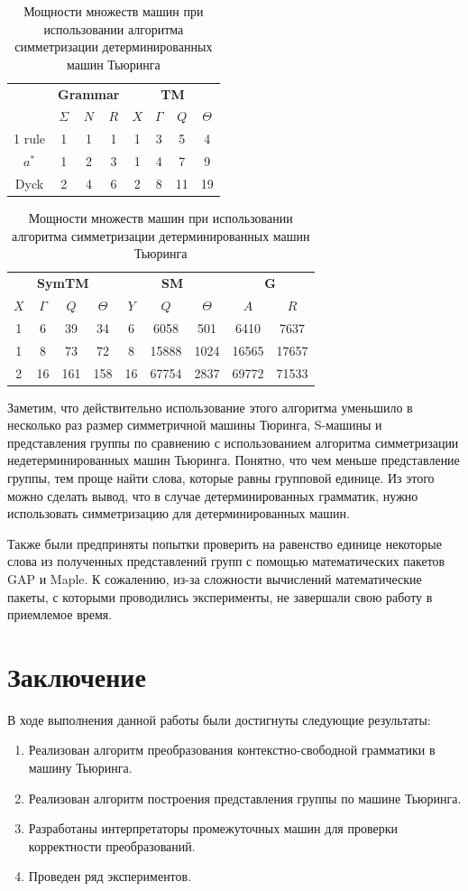 \documentclass[14pt]{matmex-diploma-custom}
\begin{document}
\begin{table}[H]
\centering
\begin{tabular}{|c|
c|c|c|
c|c|c|c|}
\hline
&
\multicolumn{3}{|c|}{\textbf{Grammar}}&
\multicolumn{4}{|c|}{\textbf{TM}}\\
\cline{2-8}
&$\Sigma$&$N$&$R$
&$X$&$\Gamma$&$Q$&$\Theta$\\
\hline
1 rule
&1&1&1
&1&3&5&4\\
\hline
$a^*$
&1&2&3
&1&4&7&9\\
\hline
Dyck
&2&4&6
&2&8&11&19\\
\hline
\end{tabular}
\begin{tabular}{
|c|c|c|c|
c|c|c|
c|c|}
\hline
\multicolumn{4}{|c|}{\textbf{SymTM}}&
\multicolumn{3}{|c|}{\textbf{SM}}&
\multicolumn{2}{|c|}{\textbf{G}}\\
\cline{1-9}
$X$&$\Gamma$&$Q$&$\Theta$
&$Y$&$Q$&$\Theta$
&$A$&$R$\\
\hline
1&6&39&34
&6&6058&501
&6410&7637\\
\hline
1&8&73&72
&8&15888&1024
&16565&17657\\
\hline
2&16&161&158
&16&67754&2837
&69772&71533\\
\hline
\end{tabular}
\caption{Мощности множеств машин при использовании алгоритма симметризации детерминированных машин Тьюринга}
\label{tab:countdtm}
\end{table}

Заметим, что действительно использование этого алгоритма уменьшило в несколько раз размер симметричной машины Тюринга, S-машины и представления группы по сравнению с использованием алгоритма симметризации недетерминированных машин Тьюринга. Понятно, что чем меньше представление группы, тем проще найти слова, которые равны групповой единице. Из этого можно сделать вывод, что в случае детерминированных грамматик, нужно использовать симметризацию для детерминированных машин.

Также были предприняты попытки проверить на равенство единице некоторые слова из полученных представлений групп с помощью математических пакетов GAP и Maple. К сожалению, из-за сложности вычислений математические пакеты, с которыми проводились эксперименты, не завершали свою работу в приемлемое время.

\section*{Заключение}
В ходе выполнения данной работы были достигнуты следующие результаты:
\begin{enumerate}
    \item Реализован алгоритм преобразования контекстно-свободной грамматики в машину Тьюринга.
    \item Реализован алгоритм построения представления группы по машине Тьюринга.
    \item Разработаны интерпретаторы промежуточных машин для проверки корректности преобразований.
    \item Проведен ряд экспериментов.
\end{enumerate}
\end{document}
